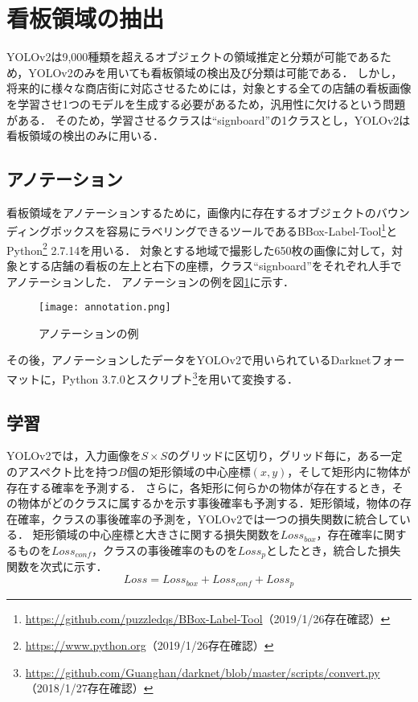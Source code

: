 \section{看板領域の抽出}
  YOLOv2は9,000種類を超えるオブジェクトの領域推定と分類が可能であるため，YOLOv2のみを用いても看板領域の検出及び分類は可能である．
  しかし，将来的に様々な商店街に対応させるためには，対象とする全ての店舗の看板画像を学習させ1つのモデルを生成する必要があるため，汎用性に欠けるという問題がある．
  そのため，学習させるクラスは``signboard''の1クラスとし，YOLOv2は看板領域の検出のみに用いる．
  \subsection{アノテーション}
    看板領域をアノテーションするために，画像内に存在するオブジェクトのバウンディングボックスを容易にラベリングできるツールであるBBox-Label-Tool\footnote{\url{https://github.com/puzzledqs/BBox-Label-Tool}（2019/1/26存在確認）}とPython\footnote{\url{https://www.python.org}（2019/1/26存在確認）} 2.7.14を用いる．
    対象とする地域で撮影した650枚の画像に対して，対象とする店舗の看板の左上と右下の座標，クラス``signboard''をそれぞれ人手でアノテーションした．
    アノテーションの例を図\ref{figure:annotation}に示す．
    \begin{figure}[tb]
      \centerline{\texttt{[image: annotation.png]}}
      \caption{アノテーションの例}
      \label{figure:annotation}
    \end{figure}
    その後，アノテーションしたデータをYOLOv2で用いられているDarknetフォーマットに，Python 3.7.0とスクリプト\footnote{\url{https://github.com/Guanghan/darknet/blob/master/scripts/convert.py}（2018/1/27存在確認）}を用いて変換する．
  \subsection{学習}
    YOLOv2では，入力画像を$S \times S$のグリッドに区切り，グリッド毎に，ある一定のアスペクト比を持つ$B$個の矩形領域の中心座標$(x, y)$，そして矩形内に物体が存在する確率を予測する．
    さらに，各矩形に何らかの物体が存在するとき，その物体がどのクラスに属するかを示す事後確率も予測する．矩形領域，物体の存在確率，クラスの事後確率の予測を，YOLOv2では一つの損失関数に統合している．
    矩形領域の中心座標と大きさに関する損失関数を$Loss_{box}$，存在確率に関するものを$Loss_{conf}$，クラスの事後確率のものを$Loss_{p}$としたとき，統合した損失関数を次式に示す．
    \begin{equation}
      Loss = Loss_{box} + Loss_{conf} + Loss_{p}
    \end{equation}

